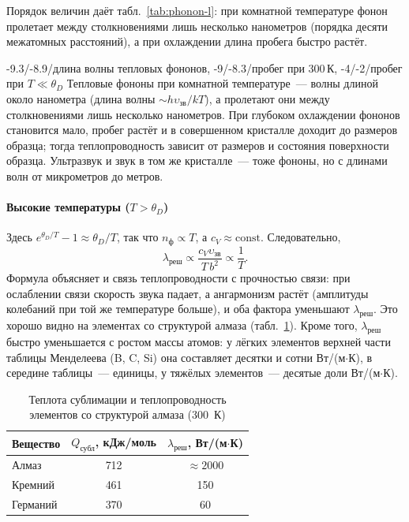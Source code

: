 Порядок величин даёт табл.~\ref{tab:phonon-l}: при комнатной температуре
фонон пролетает между столкновениями лишь несколько нанометров (порядка
десяти межатомных расстояний), а при охлаждении длина пробега быстро
растёт.

\begin{masshtab}[фононы]{-9.3/-8.9/{длина волны тепловых фононов}, -9/-8.3/{пробег при 300\,К}, -4/-2/{пробег при $T\ll\theta_D$}}
Тепловые фононы при комнатной температуре~— волны длиной около
нанометра (длина волны $\sim h\upsilon_\text{зв}/kT$), а пролетают они между
столкновениями лишь несколько нанометров. При глубоком охлаждении
фононов становится мало, пробег растёт и в совершенном кристалле
доходит до размеров образца; тогда теплопроводность зависит от размеров
и состояния поверхности образца. Ультразвук и звук в том же кристалле~—
тоже фононы, но с длинами волн от микрометров до метров.
\end{masshtab}

\paragraph{Высокие температуры ($T>\theta_D$)}
Здесь $e^{\theta_D/T}-1\approx\theta_D/T$, так что $n_\text{ф}\propto T$, а
$c_V\approx\text{const}$. Следовательно,
\begin{equation}\label{eq:lambda-highT}
\lambda_\text{реш}\propto\frac{c_V\upsilon_\text{зв}}{T\,b^2}\propto\frac1T .
\end{equation}
Формула объясняет и связь теплопроводности с прочностью связи: при
ослаблении связи скорость звука падает, а ангармонизм растёт (амплитуды
колебаний при той же температуре больше), и оба фактора уменьшают
$\lambda_\text{реш}$. Это хорошо видно на элементах со структурой алмаза
(табл.~\ref{tab:diamond-lambda}). Кроме того, $\lambda_\text{реш}$ быстро
уменьшается с ростом массы атомов: у лёгких элементов верхней части
таблицы Менделеева (B, C, Si) она составляет десятки и сотни
Вт/(м$\cdot$К), в середине таблицы~— единицы, у тяжёлых элементов~—
десятые доли Вт/(м$\cdot$К).

\begin{table}[ht]
\centering
\caption{Теплота сублимации и теплопроводность элементов со структурой
алмаза (300~К)}\label{tab:diamond-lambda}
\small
\begin{tabular}{lcc}
\toprule
Вещество & $Q_\text{субл}$, кДж/моль & $\lambda_\text{реш}$, Вт/(м$\cdot$К)\\
\midrule
Алмаз & 712 & $\approx2000$\\
Кремний & 461 & 150\\
Германий & 370 & 60\\
\bottomrule
\end{tabular}
\end{table}

